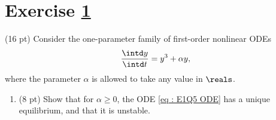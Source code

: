 


%
%
%
%


\section{Exercise \ref{sec : Math211 Summer2019 Exam1 Q5}}
\label{sec : Math211 Summer2019 Exam1 Q5}

(16 pt) Consider the one-parameter family of first-order nonlinear ODEs
\begin{align}
\frac{\intd y}{\intd t}
=
y^{3} + \alpha y,%
\label{eq : E1Q5 ODE}
\end{align}
where the parameter $\alpha$ is allowed to take any value in $\reals$.



\begin{enumerate}[label=(\alph*)]
\item\label{itm : E1Q5a} (8 pt) Show that for $\alpha \geq 0$, the ODE \eqref{eq : E1Q5 ODE} has a unique equilibrium, and that it is unstable.
\end{enumerate}

